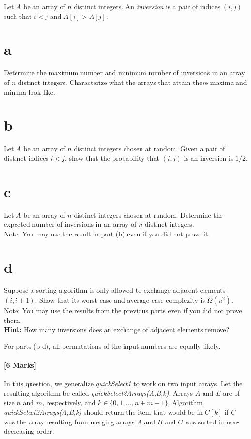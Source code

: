 \documentclass[12pt]{article}
\begin{document}
	Let $A$ be an array of $n$ distinct integers. An {\em inversion} is a pair of indices $(i, j)$ such that $i < j$ and $A[i] > A[j]$.
	\begin{enumerate}
		\part{a} Determine the maximum number and minimum number of inversions in an array of $n$ distinct integers. 
		Characterize what the arrays that attain these maxima and minima look like.
		
		\part{b} Let $A$ be an array of $n$ distinct integers chosen at random.
		Given a pair of distinct indices $i<j$, show that the probability that $(i, j)$ is an inversion is $1/2$. 
		
		\part{c} Let $A$ be an array of $n$ distinct integers chosen at random.
		Determine the expected number of inversions in an array of $n$ distinct integers. \\
		Note: You may use the result in part (b) even if you did not prove it.
		
		\part{d} Suppose a sorting algorithm is only allowed to exchange adjacent elements $(i, i + 1)$.
		Show that its worst-case and average-case complexity is $\Omega(n^2)$. \\
		Note: You may use the results from the previous parts even if you did not prove them. \\
		\textbf{Hint:} How many inversions does an exchange of adjacent elements remove?
		
	\end{enumerate}
	For parts (b-d), all permutations of the input-numbers are equally likely.
	\subsection{[6 Marks]}
	
	In this question, we generalize \textit{quickSelect1} to work on two input arrays. 
	Let the resulting algorithm be called \emph{quickSelect2Arrays(A,B,k)}.
	Arrays $A$ and $B$ are of size $n$ and $m$, respectively, and $k\in \{ 0,1,...,n+m-1 \}$. 
	Algorithm \emph{quickSelect2Arrays(A,B,k)} should return the item that would be in $C[k]$ if $C$ was the array resulting from merging arrays $A$ and $B$ and $C$ was sorted in non-decreasing order. 
	
\end{document}
